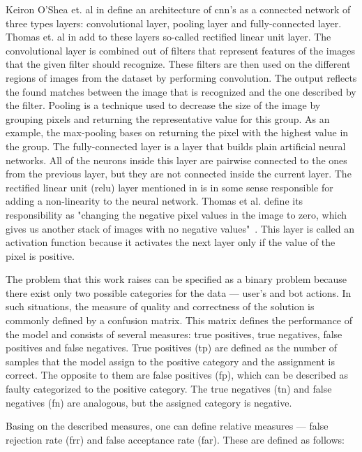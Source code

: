 Keiron O'Shea et. al in \cite{cnn-description} define an architecture of \gls{cnn}'s as a connected network of three types layers: convolutional layer, pooling layer and fully-connected layer.
Thomas et. al in \cite{thomas2020machine} add to these layers so-called rectified linear unit layer.
The convolutional layer is combined out of filters that represent features of the images that the given filter should recognize.
These filters are then used on the different regions of images from the dataset by performing convolution.
The output reflects the found matches between the image that is recognized and the one described by the filter.
Pooling is a technique used to decrease the size of the image by grouping pixels and returning the representative value for this group.
As an example, the max-pooling bases on returning the pixel with the highest value in the group.
The fully-connected layer is a layer that builds plain artificial neural networks.
All of the neurons inside this layer are pairwise connected to the ones from the previous layer, but they are not connected inside the current layer.
The rectified linear unit (\gls{relu}) layer mentioned in \cite{thomas2020machine} is in some sense responsible for adding a non-linearity to the neural network.
Thomas et al. define its responsibility as "changing the negative pixel values in the image to zero, which gives us another stack of images with no negative values"~\cite{thomas2020machine}.
This layer is called an activation function because it activates the next layer only if the value of the pixel is positive.

The problem that this work raises can be specified as a binary problem because there exist only two possible categories for the data --- user's and bot actions.
In such situations, the measure of quality and correctness of the solution is commonly defined by a confusion matrix.
This matrix defines the performance of the model and consists of several measures: true positives, true negatives, false positives and false negatives.
True positives (\gls{tp}) are defined as the number of samples that the model assign to the positive category and the assignment is correct.
The opposite to them are false positives (\gls{fp}), which can be described as faulty categorized to the positive category.
The true negatives (\gls{tn}) and false negatives (\gls{fn}) are analogous, but the assigned category is negative.

Basing on the described measures, one can define relative measures --- false rejection rate (\gls{frr}) and false acceptance rate (\gls{far}).
These are defined as follows:

